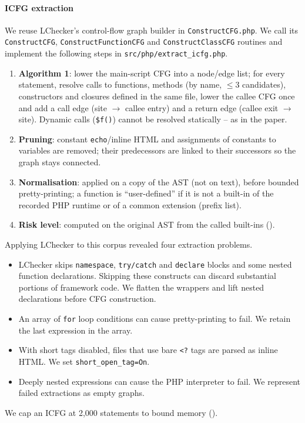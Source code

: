 \paragraph{ICFG extraction}
We reuse LChecker's control-flow graph builder in \texttt{ConstructCFG.php}. We call its
\texttt{ConstructCFG}, \texttt{ConstructFunctionCFG} and \texttt{ConstructClassCFG} routines and implement
the following steps in \texttt{src/php/extract\_icfg.php}.
\begin{enumerate}
  \item \textbf{Algorithm 1}: lower the main-script CFG into a node/edge list; for every statement, resolve calls to
        functions, methods (by name, $\le$3 candidates), constructors and closures defined in the same file, lower the
        callee CFG once and add a call edge (site $\to$ callee entry) and a return edge (callee exit $\to$ site).
        Dynamic calls (\verb|$f()|) cannot be resolved statically -- as in the paper.
  \item \textbf{Pruning}: constant \texttt{echo}/inline HTML and assignments of constants to variables are removed;
        their predecessors are linked to their successors so the graph stays connected.
  \item \textbf{Normalisation}: applied on a copy of the AST (not on text), before bounded pretty-printing;
        a function is ``user-defined'' if it is not a built-in of the recorded PHP runtime or of a common extension (prefix list).
  \item \textbf{Risk level}: computed on the original AST from the called built-ins ().
\end{enumerate}
Applying LChecker to this corpus revealed four extraction problems.
\begin{itemize}
  \item LChecker skips \texttt{namespace}, \texttt{try/catch} and \texttt{declare} blocks and some nested
        function declarations. Skipping these constructs can discard substantial portions of framework code.
        We flatten the wrappers and lift nested declarations before CFG construction.
  \item An array of \texttt{for} loop conditions can cause pretty-printing to fail. We retain the last
        expression in the array.
  \item With short tags disabled, files that use bare \verb|<?| tags are parsed as inline HTML. We set
        \texttt{short\_open\_tag=On}.
  \item Deeply nested expressions can cause the PHP interpreter to fail. We represent failed extractions
        as empty graphs.
\end{itemize}
We cap an ICFG at 2,000 statements to bound memory ().

